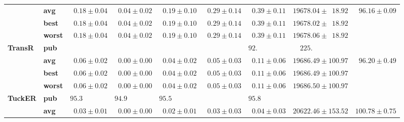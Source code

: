 \begin{tabular}{llrrrrrrr}
       & \textbf{avg} &  $\phantom{0}0.18 \pm 0.04$ &  $\phantom{0}0.04 \pm 0.02$ &  $\phantom{0}0.19 \pm 0.10$ &  $\phantom{0}0.29 \pm 0.14$ &  $\phantom{0}0.39 \pm 0.11$ &            $19678.04 \pm \phantom{0}18.92$ &  $\phantom{0}96.16 \pm 0.09$ \\
       & \textbf{best} &  $\phantom{0}0.18 \pm 0.04$ &  $\phantom{0}0.04 \pm 0.02$ &  $\phantom{0}0.19 \pm 0.10$ &  $\phantom{0}0.29 \pm 0.14$ &  $\phantom{0}0.39 \pm 0.11$ &            $19678.02 \pm \phantom{0}18.92$ &                              \\
       & \textbf{worst} &  $\phantom{0}0.18 \pm 0.04$ &  $\phantom{0}0.04 \pm 0.02$ &  $\phantom{0}0.19 \pm 0.10$ &  $\phantom{0}0.29 \pm 0.14$ &  $\phantom{0}0.39 \pm 0.11$ &            $19678.06 \pm \phantom{0}18.92$ &                              \\
\textbf{TransR} & \textbf{pub} &                             &                             &                             &                             &  $92.\phantom{00 \pm 0.00}$ &  $\phantom{00}225.\phantom{00 \pm 000.00}$ &                              \\
       & \textbf{avg} &  $\phantom{0}0.06 \pm 0.02$ &  $\phantom{0}0.00 \pm 0.00$ &  $\phantom{0}0.04 \pm 0.02$ &  $\phantom{0}0.05 \pm 0.03$ &  $\phantom{0}0.11 \pm 0.06$ &                      $19686.49 \pm 100.97$ &  $\phantom{0}96.20 \pm 0.49$ \\
       & \textbf{best} &  $\phantom{0}0.06 \pm 0.02$ &  $\phantom{0}0.00 \pm 0.00$ &  $\phantom{0}0.04 \pm 0.02$ &  $\phantom{0}0.05 \pm 0.03$ &  $\phantom{0}0.11 \pm 0.06$ &                      $19686.49 \pm 100.97$ &                              \\
       & \textbf{worst} &  $\phantom{0}0.06 \pm 0.02$ &  $\phantom{0}0.00 \pm 0.00$ &  $\phantom{0}0.04 \pm 0.02$ &  $\phantom{0}0.05 \pm 0.03$ &  $\phantom{0}0.11 \pm 0.06$ &                      $19686.50 \pm 100.97$ &                              \\
\textbf{TuckER} & \textbf{pub} &  $95.3\phantom{0 \pm 0.00}$ &  $94.9\phantom{0 \pm 0.00}$ &  $95.5\phantom{0 \pm 0.00}$ &                             &  $95.8\phantom{0 \pm 0.00}$ &                                            &                              \\
       & \textbf{avg} &  $\phantom{0}0.03 \pm 0.01$ &  $\phantom{0}0.00 \pm 0.00$ &  $\phantom{0}0.02 \pm 0.01$ &  $\phantom{0}0.03 \pm 0.03$ &  $\phantom{0}0.04 \pm 0.03$ &                      $20622.46 \pm 153.52$ &            $100.78 \pm 0.75$ \\
\bottomrule
\end{tabular}

